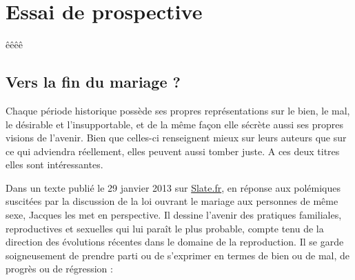 

\part{Essai de prospective}


êêêê \chapter{Vers la fin du mariage ?}

 Chaque période historique possède ses propres représentations sur le bien, le mal, le désirable et l'insupportable, et de la même façon elle sécrète aussi ses propres visions de l'avenir. Bien que celles-ci renseignent mieux sur leurs auteurs que sur ce qui adviendra réellement, elles peuvent aussi tomber juste. A ces deux titres elles sont intéressantes. 
 
 Dans un texte publié le 29 janvier 2013 sur \href{http://www.slate.fr}{Slate.fr}, en réponse aux polémiques suscitées par la discussion de la loi ouvrant le mariage aux personnes de même sexe, Jacques  les met en perspective. Il dessine l'avenir des pratiques familiales, reproductives et sexuelles qui lui paraît le plus probable, compte tenu de la direction des évolutions récentes dans le domaine de la reproduction. Il se garde soigneusement de prendre parti ou de s'exprimer en termes de bien ou de mal, de progrès ou de régression  : 

